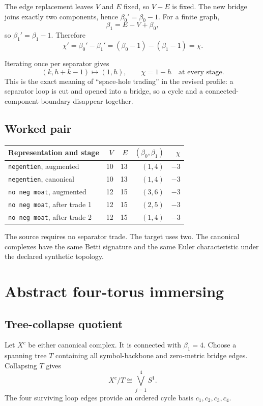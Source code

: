 \documentclass[10pt,a4paper]{article}
\newcommand{\code}[1]{\texttt{#1}}
\newcommand{\bettiZero}{\beta_0}
\newcommand{\bettiOne}{\beta_1}
\begin{document}
\begin{proofbox}
The edge replacement leaves $V$ and $E$ fixed, so $V-E$ is fixed. The new bridge joins exactly two components, hence $\bettiZero'=\bettiZero-1$. For a finite graph,
\[
\bettiOne=E-V+\bettiZero,
\]
so $\bettiOne'=\bettiOne-1$. Therefore
\[
\chi'=\bettiZero'-\bettiOne'
=(\bettiZero-1)-(\bettiOne-1)=\chi.
\]
\end{proofbox}

Iterating once per separator gives
\[
(k,h+k-1)\longmapsto(1,h),
\qquad
\chi=1-h\quad\text{at every stage}.
\]
This is the exact meaning of ``space-hole trading'' in the revised profile: a separator loop is cut and opened into a bridge, so a cycle and a connected-component boundary disappear together.

\subsection{Worked pair}
\begin{metricbox}
\begin{tabularx}{\textwidth}{Xrrrr}
\toprule
\textbf{Representation and stage} & $V$ & $E$ & $(\bettiZero,\bettiOne)$ & $\chi$\\
\midrule
\code{negentien}, augmented & 10 & 13 & $(1,4)$ & $-3$\\
\code{negentien}, canonical & 10 & 13 & $(1,4)$ & $-3$\\
\code{no neg moat}, augmented & 12 & 15 & $(3,6)$ & $-3$\\
\code{no neg moat}, after trade 1 & 12 & 15 & $(2,5)$ & $-3$\\
\code{no neg moat}, after trade 2 & 12 & 15 & $(1,4)$ & $-3$\\
\bottomrule
\end{tabularx}
\end{metricbox}
The source requires no separator trade. The target uses two. The canonical complexes have the same Betti signature and the same Euler characteristic under the declared synthetic topology.

\section{Abstract four-torus immersing}

\subsection{Tree-collapse quotient}
Let $X^c$ be either canonical complex. It is connected with $\bettiOne=4$. Choose a spanning tree $T$ containing all symbol-backbone and zero-metric bridge edges. Collapsing $T$ gives
\[
X^c/T\cong\bigvee_{j=1}^{4}S^1.
\]
The four surviving loop edges provide an ordered cycle basis $c_1,c_2,c_3,c_4$.
\end{document}
